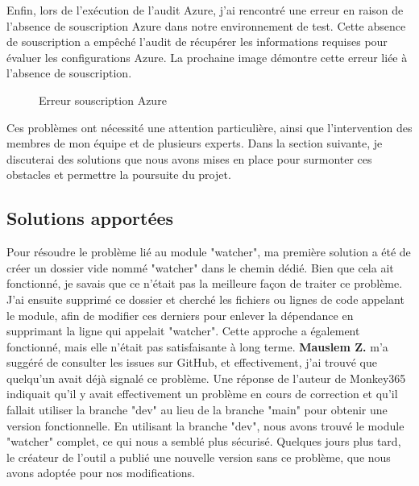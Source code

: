 Enfin, lors de l'exécution de l'audit Azure, j'ai rencontré une erreur en raison de l'absence de souscription Azure dans notre environnement de test. Cette absence de souscription a empêché l'audit de récupérer les informations requises pour évaluer les configurations Azure. La prochaine image démontre cette erreur liée à l'absence de souscription.

\begin{figure}[H]
    \begin{center}
        \caption{Erreur souscription Azure}
    \end{center}
\end{figure}

Ces problèmes ont nécessité une attention particulière, ainsi que l'intervention des membres de mon équipe et de plusieurs experts. Dans la section suivante, je discuterai des solutions que nous avons mises en place pour surmonter ces obstacles et permettre la poursuite du projet.

\subsection{Solutions apportées}

Pour résoudre le problème lié au module "watcher", ma première solution a été de créer un dossier vide nommé "watcher" dans le chemin dédié. Bien que cela ait fonctionné, je savais que ce n'était pas la meilleure façon de traiter ce problème. J'ai ensuite supprimé ce dossier et cherché les fichiers ou lignes de code appelant le module, afin de modifier ces derniers pour enlever la dépendance en supprimant la ligne qui appelait "watcher". Cette approche a également fonctionné, mais elle n'était pas satisfaisante à long terme. \textbf{Mauslem Z.} m'a suggéré de consulter les issues sur GitHub, et effectivement, j'ai trouvé que quelqu'un avait déjà signalé ce problème. Une réponse de l'auteur de Monkey365 indiquait qu'il y avait effectivement un problème en cours de correction et qu'il fallait utiliser la branche "dev" au lieu de la branche "main" pour obtenir une version fonctionnelle. En utilisant la branche "dev", nous avons trouvé le module "watcher" complet, ce qui nous a semblé plus sécurisé. Quelques jours plus tard, le créateur de l'outil a publié une nouvelle version sans ce problème, que nous avons adoptée pour nos modifications.

